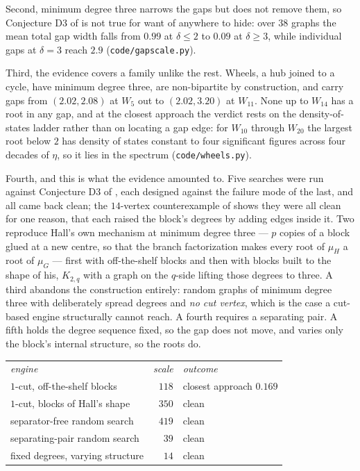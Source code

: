 \documentclass[11pt]{article}
\theoremstyle{remark}
\begin{document}
Second, minimum degree three narrows the gaps but does not remove them, so
Conjecture D3 of \cite{PartI} is not true for want of anywhere to hide: over $38$ graphs the mean
total gap width falls from $0.99$ at $\delta\le2$ to $0.09$ at $\delta\ge3$, while individual
gaps at $\delta=3$ reach $2.9$ (\texttt{code/gapscale.py}).

Third, the evidence covers a family unlike the rest. Wheels, a hub joined to a cycle, have
minimum degree three, are non-bipartite by construction, and carry gaps from $(2.02,2.08)$ at
$W_5$ out to $(2.02,3.20)$ at $W_{11}$. None up to $W_{14}$ has a root in any gap, and at the
closest approach the verdict rests on the density-of-states ladder rather than on locating a gap
edge: for $W_{10}$ through $W_{20}$ the largest root below $2$ has density of states constant to
four significant figures across four decades of $\eta$, so it lies in the spectrum
(\texttt{code/wheels.py}).

Fourth, and this is what the evidence amounted to. Five searches were run against
Conjecture D3 of \cite{PartI}, each designed against the failure mode of the last, and all came
back clean; the $14$-vertex counterexample of \cite{PartI} shows they were all clean for one reason, that each
raised the block's degrees by adding edges inside it. Two reproduce Hall's own mechanism at
minimum degree three --- $p$ copies of a block glued
at a new centre, so that the branch factorization makes every root of $\mu_H$ a root of $\mu_G$
--- first with off-the-shelf blocks and then with blocks built to the shape of his, $K_{2,q}$ with
a graph on the $q$-side lifting those degrees to three. A third abandons the construction
entirely: random graphs of minimum degree three with deliberately spread degrees and \emph{no cut
vertex}, which is the case a cut-based engine structurally cannot reach. A fourth requires a
separating pair. A fifth holds the degree sequence fixed, so the gap does not move, and varies
only the block's internal structure, so the roots do.

\begin{center}
\begin{tabular}{lrl}
\emph{engine} & \emph{scale} & \emph{outcome}\\[2pt]
$1$-cut, off-the-shelf blocks      & $118$ & closest approach $0.169$\\
$1$-cut, blocks of Hall's shape    & $350$ & clean\\
separator-free random search       & $419$ & clean\\
separating-pair random search      & $39$  & clean\\
fixed degrees, varying structure   & $14$  & clean
\end{tabular}
\end{center}
\end{document}
